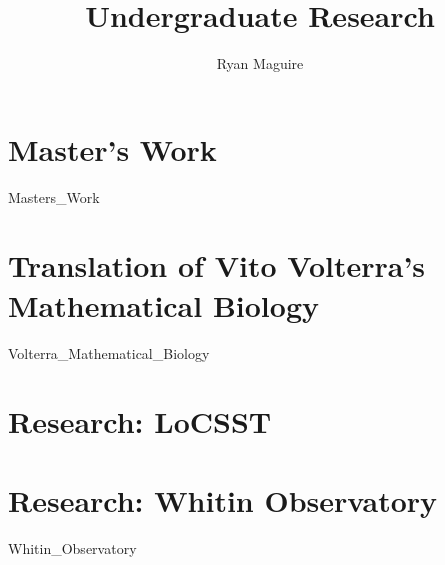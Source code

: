 \documentclass[crop=false,class=book,oneside]{standalone}
\begin{document}
    \newif\ifresearch
    \ifstandalone
        \title{Undergraduate Research}
        \author{Ryan Maguire}
        \date{\vspace{-5ex}}
        \maketitle
        \tableofcontents
        \listoffigures
        \listoftables
        \clearpage
    \fi
    \part{Master's Work}
        {Masters_Work}
    \part{Translation of Vito Volterra's Mathematical Biology}
        
                  {Volterra_Mathematical_Biology}
    \part{Research: LoCSST}
    \part{Research: Whitin Observatory}
        {Whitin_Observatory}
\end{document}
